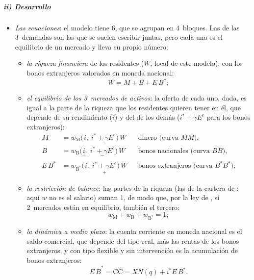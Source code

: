 \documentclass[11pt]{article}
\begin{document}
\subparagraph{ii) Desarrollo}
\begin{itemize}
\item \emph{Las ecuaciones}: el modelo tiene 6, que se agrupan en 4~bloques. Las de las 3~demandas son las que se suelen escribir juntas, pero cada una es el equilibrio de un mercado y lleva su propio número:
  \begin{itemize}
  \item \emph{la riqueza financiera} de los residentes ($W$, local de este modelo), con los bonos extranjeros valorados en moneda nacional:
  \begin{equation}\label{eq:riqueza-branson}
  W=M+B+E\,B^{*} ;
  \end{equation}
  \item \emph{el equilibrio de los 3~mercados de activos}: la oferta de cada uno, dada, es igual a la parte de la riqueza que los residentes quieren tener en él, que depende de su rendimiento ($i$) y del de los demás ($i^*+\gamma E^e$ para los bonos extranjeros):
  \begin{align}
  M&=w_{\mathrm M}\big(\underset{-}{i},\,\underset{-}{i^{*}+\gamma E^e}\big)\,W &&\text{dinero (curva $MM$),}\label{eq:branson-mm}\\
  B&=w_{\mathrm B}\big(\underset{+}{i},\,\underset{-}{i^{*}+\gamma E^e}\big)\,W &&\text{bonos nacionales (curva $BB$),}\label{eq:branson-bb}\\
  E\,B^{*}&=w_{\mathrm B^*}\big(\underset{-}{i},\,\underset{+}{i^{*}+\gamma E^e}\big)\,W &&\text{bonos extranjeros (curva $B^*B^*$);}\label{eq:branson-bbe}
  \end{align}
  \item \emph{la restricción de balance}: las partes de la riqueza (las de la cartera de : aquí $w$ no es el salario) suman 1, de modo que, por la ley de , si 2~mercados están en equilibrio, también el tercero:
  \begin{equation}\label{eq:branson-suma}
  w_{\mathrm M}+w_{\mathrm B}+w_{\mathrm B^*}=1 ;
  \end{equation}
  \item \emph{la dinámica a medio plazo}: la cuenta corriente en moneda nacional es el saldo comercial, que depende del tipo real, más las rentas de los bonos extranjeros, y con tipo flexible y sin intervención es la acumulación de bonos extranjeros:
  \begin{equation}\label{eq:acumulacion-branson}
  E\,\dot B^{*}=\mathrm{CC}=XN(q)+i^{*}E\,B^{*} .
  \end{equation}

\end{itemize}
\end{itemize}
\end{document}
